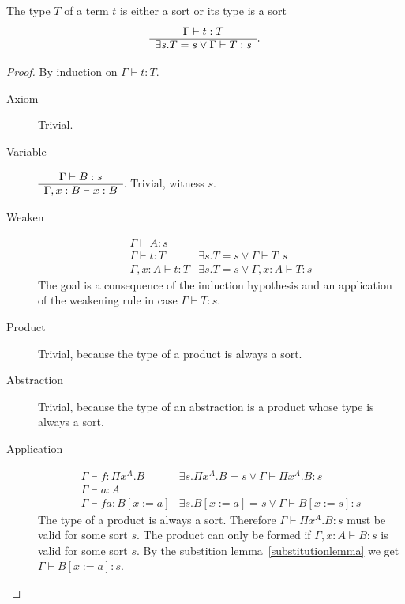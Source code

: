 \begin{theorem} The type $T$ of a term $t$ is either a sort or its type is a
  sort
  $$
  \begin{array}{c} \Gamma \vdash t:T \\ \hline \exists s. T = s \lor \Gamma\vdash T:s\end{array}.
  $$

  \begin{proof}
    By induction on $\Gamma\vdash t:T$.
    \begin{description}

    \item[Axiom] Trivial.


    \item[Variable]
      $\begin{array}{c} \Gamma\vdash B:s \\ \hline \Gamma,x:B \vdash x:B\end{array}
      $. Trivial, witness $s$.

    \item[Weaken]
      $$
      \begin{array}{l|l}
        \Gamma \vdash A:s &
        \\
        \Gamma \vdash t:T & \exists s. T = s \lor \Gamma \vdash T:s
        \\
        \hline
        \Gamma,x:A \vdash t:T   & \exists s.
                                  T = s \lor \Gamma,x:A \vdash T:s
      \end{array}
      $$
      The goal is a consequence of the induction hypothesis and an
      application of the weakening rule in case $\Gamma\vdash T:s$.

    \item[Product] Trivial, because the type of a product is always a sort.

    \item[Abstraction] Trivial, because the type of an abstraction is a
      product whose type is always a sort.

    \item[Application]
      $$
      \begin{array}{l|l}
        \Gamma\vdash f:\Pi x^A.B & \exists s. \Pi x^A.B = s \lor
                                   \Gamma\vdash \Pi x^A.B: s
        \\
        \Gamma\vdash a:A
        \\
        \hline
        \Gamma\vdash f a:B[x:=a] & \exists s. B[x:=a] = s \lor
                                   \Gamma\vdash B[x:=s]: s
      \end{array}
      $$
      The type of a product is always a sort. Therefore
      $\Gamma\vdash \Pi x^A.B : s $ must be valid for some sort $s$. The
      product can only be formed if $\Gamma,x:A \vdash B:s$ is valid for some
      sort $s$. By the substition lemma~\ref{substitutionlemma} we get $\Gamma
      \vdash B[x:=a]: s$.


\end{description}
\end{proof}
\end{theorem}
